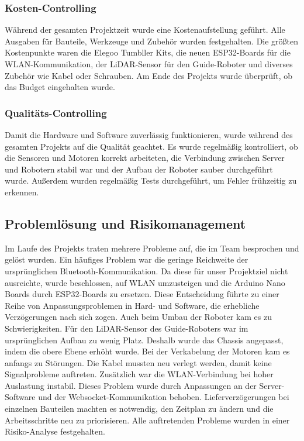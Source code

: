 \subsubsection{Kosten-Controlling}
Während der gesamten Projektzeit wurde eine Kostenaufstellung geführt. Alle Ausgaben für Bauteile, Werkzeuge und Zubehör wurden festgehalten.
Die größten Kostenpunkte waren die Elegoo Tumbller Kits, die neuen ESP32-Boards für die WLAN-Kommunikation, der LiDAR-Sensor für den Guide-Roboter und diverses Zubehör wie Kabel oder Schrauben.
Am Ende des Projekts wurde überprüft, ob das Budget eingehalten wurde.
\subsubsection{Qualitäts-Controlling}
Damit die Hardware und Software zuverlässig funktionieren, wurde während des gesamten Projekts auf die Qualität geachtet.
Es wurde regelmäßig kontrolliert, ob die Sensoren und Motoren korrekt arbeiteten, die Verbindung zwischen Server und Robotern stabil war und der Aufbau der Roboter sauber durchgeführt wurde.
Außerdem wurden regelmäßig Tests durchgeführt, um Fehler frühzeitig zu erkennen.
%
\subsection{Problemlösung und Risikomanagement}
%
Im Laufe des Projekts traten mehrere Probleme auf, die im Team besprochen und gelöst wurden.
Ein häufiges Problem war die geringe Reichweite der ursprünglichen Bluetooth-Kommunikation. Da diese für unser Projektziel nicht ausreichte, wurde beschlossen, auf WLAN umzusteigen und die Arduino Nano Boards durch ESP32-Boards zu ersetzen.
Diese Entscheidung führte zu einer Reihe von Anpassungsproblemen in Hard- und Software, 
die erhebliche Verzögerungen nach sich zogen.
Auch beim Umbau der Roboter kam es zu Schwierigkeiten. Für den LiDAR-Sensor des Guide-Roboters war im ursprünglichen Aufbau zu wenig Platz. Deshalb wurde das Chassis angepasst, indem die obere Ebene erhöht wurde.
Bei der Verkabelung der Motoren kam es anfangs zu Störungen. Die Kabel mussten neu verlegt werden, damit keine Signalprobleme auftreten.
Zusätzlich war die WLAN-Verbindung bei hoher Auslastung instabil. Dieses Problem wurde durch Anpassungen an der Server-Software und der Websocket-Kommunikation behoben.
Lieferverzögerungen bei einzelnen Bauteilen machten es notwendig, den Zeitplan zu ändern und die Arbeitsschritte neu zu priorisieren.
Alle auftretenden Probleme wurden in einer Risiko-Analyse festgehalten.
